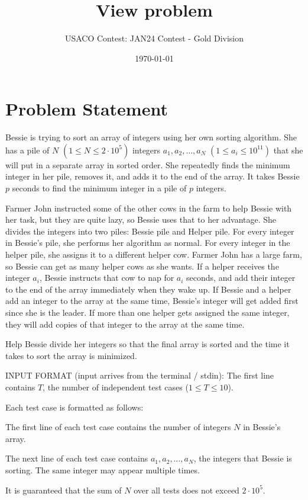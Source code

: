 \documentclass[12pt]{article}
\title{View problem}
\author{USACO Contest: JAN24 Contest - Gold Division}
\date{\today}
\begin{document}
\maketitle

\section*{Problem Statement}


Bessie is trying to sort an array of integers using her own sorting algorithm.
She has a pile of $N$ $(1 \leq N \leq 2\cdot 10^5)$ integers $a_1,a_2,\dots,a_N$
$(1 \leq a_i \leq 10^{11})$ that she will put in a separate array in sorted
order. She repeatedly finds the minimum integer in her pile, removes it, and
adds it to the end of the array. It takes Bessie $p$ seconds to find the minimum
integer in a pile of $p$ integers.

Farmer John instructed some of the other cows in the farm to help Bessie with
her task, but they are quite lazy, so Bessie uses that to her advantage. She
divides the integers into two piles: Bessie pile and Helper pile. For every
integer in Bessie's pile, she performs her algorithm as normal. For every
integer in the helper pile, she assigns it to a different helper cow. Farmer
John has a large farm, so Bessie can get as many helper cows as she wants. If a
helper receives the integer $a_i$, Bessie instructs that cow to nap for $a_i$
seconds, and add their integer to the end of the array immediately when they
wake up. If Bessie and a helper add an integer to the array at the same time,
Bessie's integer will get added first since she is the leader. If more than one
helper gets assigned the same integer, they will add copies of that integer to
the array at the same time.

Help Bessie divide her integers so that the final array is sorted and the time
it takes to sort the array is minimized.

INPUT FORMAT (input arrives from the terminal / stdin):
The first line contains $T$, the number of independent test cases
($1\le T\le 10$). 

Each test case is formatted as follows:

The first line of each test case contains the number of integers $N$ in Bessie's
array.

The next line of each test case contains $a_1, a_2, \dots, a_N$, the integers
that Bessie is sorting. The same integer may appear multiple times.

It is guaranteed that the sum of $N$ over all tests does not exceed
$2\cdot 10^5$.
\end{document}
